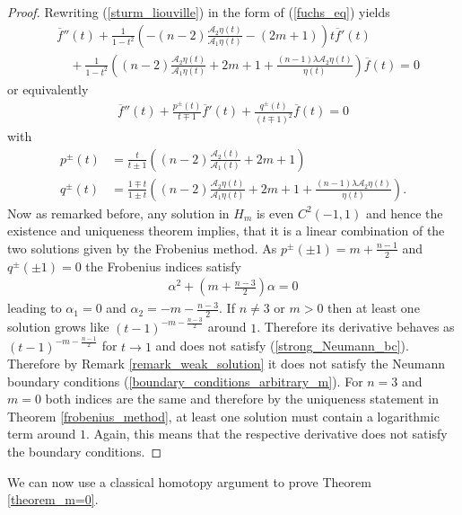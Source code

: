 \documentclass[12pt,twoside]{amsart}
\numberwithin{satz}{section}
\theoremstyle{definition}
\numberwithin{equation}{section}
\begin{document}
	\begin{proof}
		Rewriting (\ref{sturm_liouville}) in the form of (\ref{fuchs_eq}) yields 
		\begin{align*}
			&\overline{f}''(t)+\frac{1}{1-t^2}\left(-(n-2)\frac{\mathcal{A}_2\eta(t)}{\mathcal{A}_1\eta(t)}-(2m+1)\right)t \overline{f}'(t) \\
			&\quad +\frac{1}{1-t^2}\left((n-2)\frac{\mathcal{A}_2\eta(t)}{\mathcal{A}_1\eta(t)}+2m+1+\frac{(n-1)\lambda\mathcal{A}_2\eta(t)}{\eta(t)}\right)\overline{f}(t)=0
		\end{align*}
		or equivalently 
		\begin{align*}
			\overline{f}''(t)+\frac{p^\pm(t)}{t \mp 1}\overline{f}'(t)+\frac{q^\pm(t)}{(t \mp 1)^2}\overline{f}(t)=0
		\end{align*}
		with 
		\begin{align*}
			p^\pm(t) & =\frac{t}{t \pm 1}((n-2) \frac{\mathcal A_2(t)}{\mathcal A_1(t)}+2m+1)\\
			q^\pm(t) & = \frac{1 \mp t}{1 \pm t} \left((n-2)\frac{\mathcal{A}_2\eta(t)}{\mathcal{A}_1\eta(t)}+2m+1+\frac{(n-1)\lambda\mathcal{A}_2\eta(t)}{\eta(t)}\right).
		\end{align*}
		Now as remarked before, any solution in $H_m$ is even $C^2(-1,1)$ and hence the existence and uniqueness theorem implies, that it is a linear combination of the two solutions given by the Frobenius method. As $p^\pm(\pm 1)=m+\frac{n-1}{2}$ and $q^{\pm}(\pm 1)=0$ the Frobenius indices satisfy 
		\begin{align*}
			\alpha^2+ \left(m+\frac{n-3}{2}\right)\alpha=0
		\end{align*}
		leading to $\alpha_1=0$ and $\alpha_2=-m-\frac{n-3}{2}$. If $n\neq 3$ or $m>0$ then at least one solution grows like $(t- 1)^{-m-\frac{n-3}{2}}$ around $1$. Therefore its derivative behaves as $(t-1)^{-m-\frac{n-1}{2}}$ for $t\to1$ and does not satisfy (\ref{strong_Neumann_bc}). Therefore by Remark \ref{remark_weak_solution} it does not satisfy the Neumann boundary conditions (\ref{boundary_conditions_arbitrary_m}). For $n=3$ and $m=0$ both indices are the same and therefore by the uniqueness statement in Theorem \ref{frobenius_method}, at least one solution must contain a logarithmic term around $1$. Again, this means that the respective derivative does not satisfy the boundary conditions.
	\end{proof}
	
	We can now use a classical homotopy argument to prove Theorem \ref{theorem_m=0}. 
	
\end{document}
